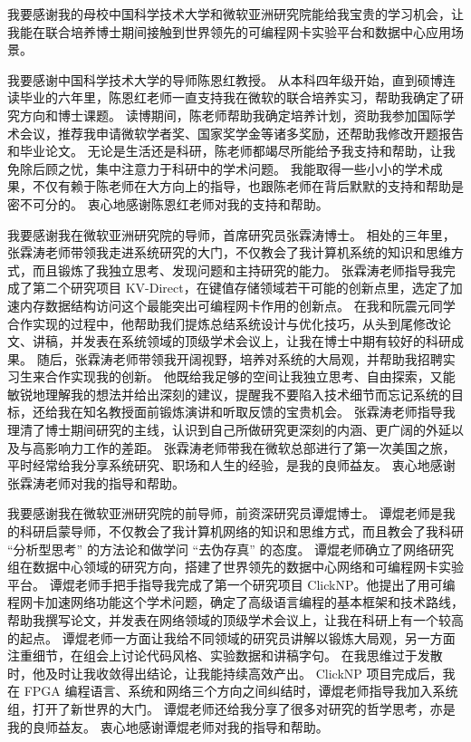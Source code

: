
\begin{acknowledgements}

我要感谢我的母校中国科学技术⼤学和微软亚洲研究院能给我宝贵的学习机会，让我能在联合培养博士期间接触到世界领先的可编程网卡实验平台和数据中心应用场景。

我要感谢中国科学技术⼤学的导师陈恩红教授。
从本科四年级开始，直到硕博连读毕业的六年里，陈恩红老师一直支持我在微软的联合培养实习，帮助我确定了研究方向和博士课题。
读博期间，陈老师帮助我确定培养计划，资助我参加国际学术会议，推荐我申请微软学者奖、国家奖学金等诸多奖励，还帮助我修改开题报告和毕业论文。
无论是生活还是科研，陈老师都竭尽所能给予我⽀持和帮助，让我免除后顾之忧，集中注意⼒于科研中的学术问题。
我能取得一些小小的学术成果，不仅有赖于陈⽼师在大方向上的指导，也跟陈老师在背后默默的⽀持和帮助是密不可分的。
衷心地感谢陈恩红老师对我的支持和帮助。

我要感谢我在微软亚洲研究院的导师，首席研究员张霖涛博士。
相处的三年里，张霖涛老师带领我走进系统研究的大门，不仅教会了我计算机系统的知识和思维方式，而且锻炼了我独立思考、发现问题和主持研究的能力。
张霖涛老师指导我完成了第二个研究项目 KV-Direct，在键值存储领域若干可能的创新点里，选定了加速内存数据结构访问这个最能突出可编程网卡作用的创新点。
在我和阮震元同学合作实现的过程中，他帮助我们提炼总结系统设计与优化技巧，从头到尾修改论文、讲稿，并发表在系统领域的顶级学术会议上，让我在博士中期有较好的科研成果。
随后，张霖涛老师带领我开阔视野，培养对系统的大局观，并帮助我招聘实习生来合作实现我的创新。
他既给我足够的空间让我独立思考、自由探索，又能敏锐地理解我的想法并给出深刻的建议，提醒我不要陷入技术细节而忘记系统的目标，还给我在知名教授面前锻炼演讲和听取反馈的宝贵机会。
张霖涛老师指导我理清了博士期间研究的主线，认识到自己所做研究更深刻的内涵、更广阔的外延以及与高影响力工作的差距。
张霖涛老师带我在微软总部进行了第一次美国之旅，平时经常给我分享系统研究、职场和人生的经验，是我的良师益友。
衷心地感谢张霖涛老师对我的指导和帮助。

我要感谢我在微软亚洲研究院的前导师，前资深研究员谭焜博⼠。
谭焜老师是我的科研启蒙导师，不仅教会了我计算机⽹络的知识和思维⽅式，⽽且教会了我科研 ``分析型思考'' 的⽅法论和做学问 ``去伪存真'' 的态度。
谭焜老师确立了网络研究组在数据中心领域的研究方向，搭建了世界领先的数据中心网络和可编程网卡实验平台。
谭焜老师手把手指导我完成了第一个研究项目 ClickNP。他提出了用可编程网卡加速网络功能这个学术问题，确定了高级语言编程的基本框架和技术路线，帮助我撰写论文，并发表在网络领域的顶级学术会议上，让我在科研上有一个较高的起点。
谭焜老师一方面让我给不同领域的研究员讲解以锻炼大局观，另一方面注重细节，在组会上讨论代码风格、实验数据和讲稿字句。
在我思维过于发散时，他及时让我收敛得出结论，让我能持续高效产出。
ClickNP 项目完成后，我在 FPGA 编程语言、系统和网络三个方向之间纠结时，谭焜老师指导我加入系统组，打开了新世界的大门。
谭焜老师还给我分享了很多对研究的哲学思考，亦是我的良师益友。
衷⼼地感谢谭焜⽼师对我的指导和帮助。


\end{acknowledgements}
